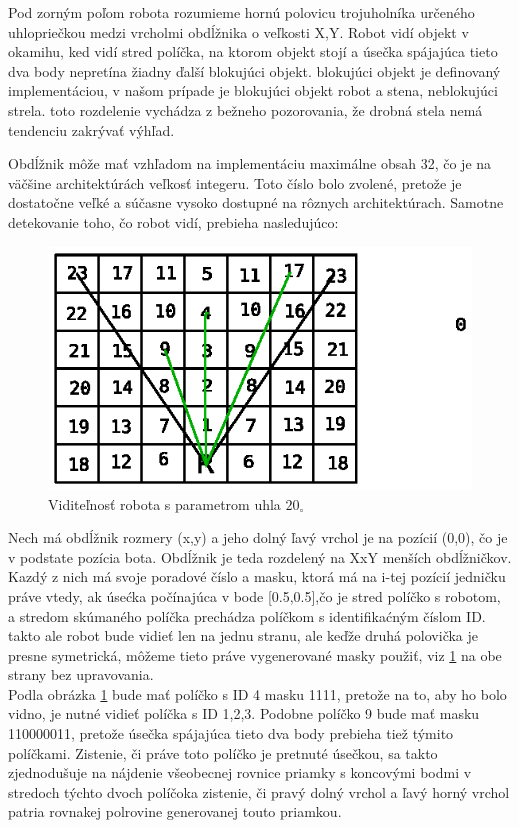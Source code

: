 \begin{definicia}
Pod zorným poľom robota rozumieme hornú polovicu trojuholníka určeného uhlopriečkou medzi vrcholmi obdĺžnika o veľkosti X,Y. Robot vidí objekt v okamihu, ked vidí stred políčka, na ktorom objekt stojí a úsečka spájajúca tieto dva body nepretína žiadny ďalší blokujúci objekt. blokujúci objekt je definovaný implementáciou, v našom prípade je blokujúci objekt robot a stena, neblokujúci strela. toto rozdelenie vychádza z bežneho pozorovania, že drobná stela nemá tendenciu zakrývať výhľad.
\end{definicia}
Obdĺžnik môže mať vzhľadom na implementáciu maximálne obsah 32, čo je na väčšine architektúrách veľkosť integeru. Toto číslo bolo zvolené, pretože je dostatočne veľké a súčasne vysoko dostupné na rôznych architektúrach. Samotne detekovanie toho, čo robot vidí, prebieha nasledujúco: \\
\begin{figure}
\centering
\includegraphics[totalheight=0.4\textheight,width=.8\textwidth]{visibility}
\caption {Viditeľnosť robota s parametrom uhla $20_\circ$}
\label{visibility}
\end{figure}
Nech má obdĺžnik rozmery (x,y) a jeho dolný ľavý vrchol je na pozícií (0,0), čo je v podstate pozícia bota. Obdĺžnik je teda rozdelený na XxY menších obdĺžničkov. Kazdý z nich má svoje poradové číslo a masku, ktorá má na i-tej pozícií jedničku práve vtedy, ak úsećka počínajúca v bode [0.5,0.5],čo je stred políčko s robotom, a stredom skúmaného políčka prechádza políčkom s identifikaćným číslom ID. takto ale robot bude vidieť len na jednu stranu, ale keďže druhá polovička je presne symetrická, môžeme tieto práve vygenerované masky použiť, viz \ref{visibility}  na obe strany bez upravovania. \\
Podla obrázka \ref{visibility} bude mať políčko s ID 4 masku 1111, pretože na to, aby ho bolo vidno, je nutné vidieť políčka s ID 1,2,3. Podobne políčko 9 bude mať masku 110000011, pretože úsečka spájajúca tieto dva body prebieha tiež týmito políčkami. Zistenie, či práve toto políčko je pretnuté úsečkou, sa takto zjednodušuje na nájdenie všeobecnej rovnice priamky s koncovými bodmi v stredoch týchto dvoch políčoka zistenie, či pravý dolný vrchol a ľavý horný vrchol patria rovnakej polrovine generovanej touto priamkou.\\
